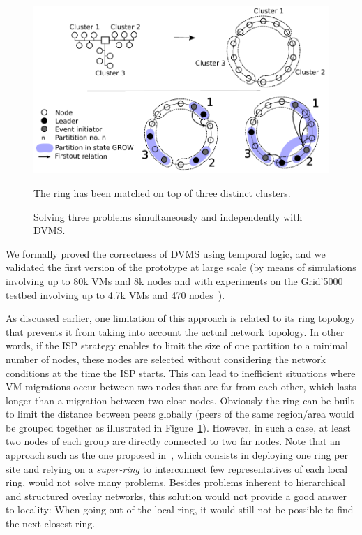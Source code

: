 \begin{figure}[h!]
  \centering
  \includegraphics[width=0.9\linewidth]{Figures/resourceAcquisition-standard.pdf}
  \caption{Solving three problems simultaneously and independently with DVMS.}%
\small{The ring has been matched on top of three distinct clusters.}
  \label{fig:isp}%
\vspace*{-.3cm}
\end{figure}

We formally proved the correctness of DVMS using temporal logic, and we validated the first version of the prototype
at large scale (by means of simulations involving up to 80k VMs and 8k nodes and with experiments on the Grid'5000 testbed involving
up to 4.7k VMs and 470 nodes~\cite{quesnel:ispa2013}).

As discussed earlier, one limitation of this approach is related to its ring topology that
prevents it from taking into account the actual network topology.
%
%
%
In other words, if the ISP strategy enables to limit the size of one partition to a
minimal number of nodes, these nodes are selected without considering the network
conditions at the time the ISP starts. This can lead to inefficient situations where VM
migrations occur between two nodes that are far from each other, which lasts longer than a
migration between two close nodes. Obviously the ring can be built to limit the
distance between peers globally (\ie peers of the same region/area would be grouped
together as illustrated in Figure~\ref{fig:isp}). However, in such a case, at least two
nodes of each group are directly connected to two far nodes.
%
Note that an approach such as the one proposed in~\cite{superchord}, which consists in
deploying one ring per site and relying on a \emph{super-ring}
to interconnect few representatives of each local ring, would not solve many
problems. Besides problems inherent to hierarchical and structured overlay networks, this
solution would not provide a good answer to locality: When going out of the local ring, it
would still not be possible to find the next closest ring.
%


